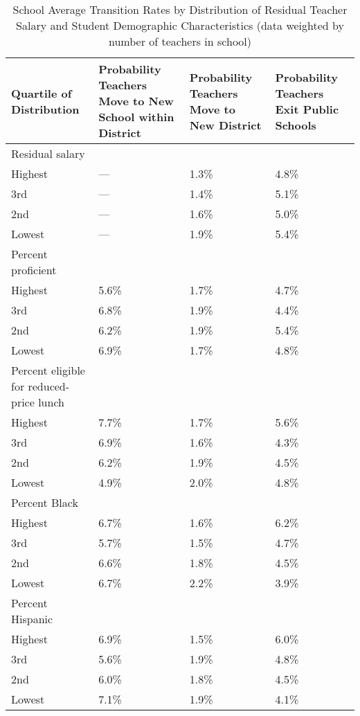 \documentclass[]{article}
\begin{document}
\begin{table}[ht]
\centering
\begin{tabular}{p{}p{}p{}p{}}
  \hline
Quartile of Distribution & Probability Teachers Move to New School within District & Probability Teachers Move to New District & Probability Teachers Exit Public Schools \\ 
  \hline
Residual salary & & & \\
\quad Highest & --- & 1.3\% & 4.8\% \\ 
  \quad 3rd & --- & 1.4\% & 5.1\% \\ 
  \quad 2nd & --- & 1.6\% & 5.0\% \\ 
  \quad Lowest & --- & 1.9\% & 5.4\% \\ 
Percent proficient & & & \\
  \quad Highest & 5.6\% & 1.7\% & 4.7\% \\ 
  \quad 3rd & 6.8\% & 1.9\% & 4.4\% \\ 
  \quad 2nd & 6.2\% & 1.9\% & 5.4\% \\ 
  \quad Lowest & 6.9\% & 1.7\% & 4.8\% \\ 
Percent eligible for reduced-price lunch & & & \\
  \quad Highest & 7.7\% & 1.7\% & 5.6\% \\ 
  \quad 3rd & 6.9\% & 1.6\% & 4.3\% \\ 
  \quad 2nd & 6.2\% & 1.9\% & 4.5\% \\ 
  \quad Lowest & 4.9\% & 2.0\% & 4.8\% \\ 
Percent Black & & & \\
  \quad Highest & 6.7\% & 1.6\% & 6.2\% \\ 
  \quad 3rd & 5.7\% & 1.5\% & 4.7\% \\ 
  \quad 2nd & 6.6\% & 1.8\% & 4.5\% \\ 
  \quad Lowest & 6.7\% & 2.2\% & 3.9\% \\ 
Percent Hispanic & & & \\
  \quad Highest & 6.9\% & 1.5\% & 6.0\% \\ 
  \quad 3rd & 5.6\% & 1.9\% & 4.8\% \\ 
  \quad 2nd & 6.0\% & 1.8\% & 4.5\% \\ 
  \quad Lowest & 7.1\% & 1.9\% & 4.1\% \\ 
   \hline
\end{tabular}
\caption{School Average Transition Rates by Distribution of Residual Teacher Salary and Student Demographic Characteristics (data weighted by number of teachers in school)} 
\label{tbl:change_by_quartile}
\end{table}
\end{document}
